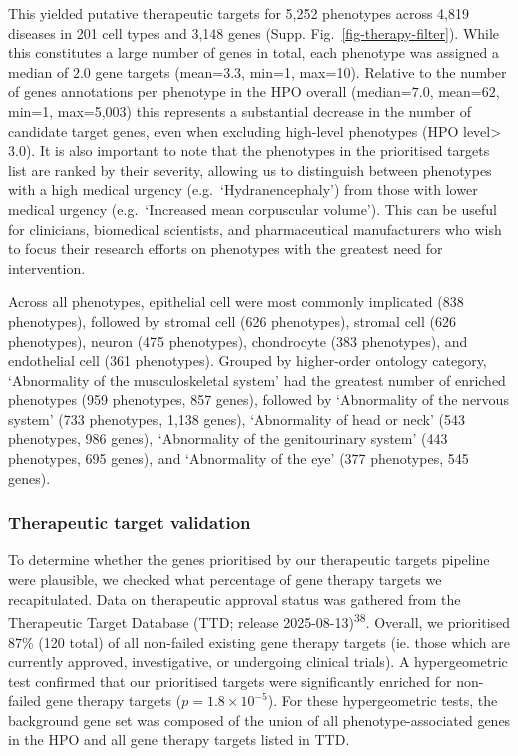 \documentclass[
]{article}
\begin{document}
This yielded putative therapeutic targets for 5,252 phenotypes across
4,819 diseases in 201 cell types and 3,148 genes (Supp.
Fig.~\ref{fig-therapy-filter}). While this constitutes a large number of
genes in total, each phenotype was assigned a median of \(2.0\) gene
targets (mean=\(3.3\), min=1, max=10). Relative to the number of genes
annotations per phenotype in the HPO overall (median=\(7.0\),
mean=\(62\), min=1, max=5,003) this represents a substantial decrease in
the number of candidate target genes, even when excluding high-level
phenotypes (HPO level\textgreater{}\(3.0\)). It is also important to
note that the phenotypes in the prioritised targets list are ranked by
their severity, allowing us to distinguish between phenotypes with a
high medical urgency (e.g.~`Hydranencephaly') from those with lower
medical urgency (e.g.~`Increased mean corpuscular volume'). This can be
useful for clinicians, biomedical scientists, and pharmaceutical
manufacturers who wish to focus their research efforts on phenotypes
with the greatest need for intervention.

Across all phenotypes, epithelial cell were most commonly implicated
(838 phenotypes), followed by stromal cell (626 phenotypes), stromal
cell (626 phenotypes), neuron (475 phenotypes), chondrocyte (383
phenotypes), and endothelial cell (361 phenotypes). Grouped by
higher-order ontology category, `Abnormality of the musculoskeletal
system' had the greatest number of enriched phenotypes (959 phenotypes,
857 genes), followed by `Abnormality of the nervous system' (733
phenotypes, 1,138 genes), `Abnormality of head or neck' (543 phenotypes,
986 genes), `Abnormality of the genitourinary system' (443 phenotypes,
695 genes), and `Abnormality of the eye' (377 phenotypes, 545 genes).

\subsubsection{Therapeutic target
validation}\label{therapeutic-target-validation}

To determine whether the genes prioritised by our therapeutic targets
pipeline were plausible, we checked what percentage of gene therapy
targets we recapitulated. Data on therapeutic approval status was
gathered from the Therapeutic Target Database (TTD; release
2025-08-13)\textsuperscript{38}. Overall, we prioritised \(87\)\% (120
total) of all non-failed existing gene therapy targets (ie. those which
are currently approved, investigative, or undergoing clinical trials). A
hypergeometric test confirmed that our prioritised targets were
significantly enriched for non-failed gene therapy targets
(\(p=\)\(1.8 \times 10^{-5}\)). For these hypergeometric tests, the
background gene set was composed of the union of all
phenotype-associated genes in the HPO and all gene therapy targets
listed in TTD.
\end{document}

